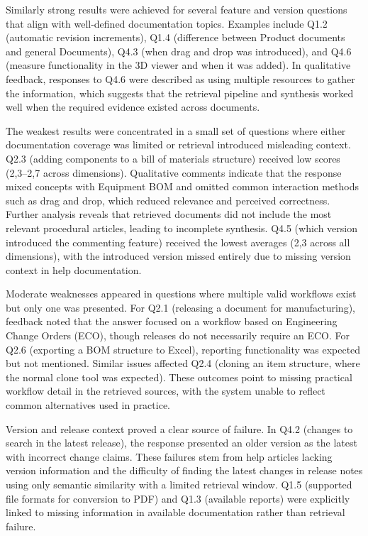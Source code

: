 Similarly strong results were achieved for several feature and version questions that align with well-defined documentation topics. Examples include Q1.2 (automatic revision increments), Q1.4 (difference between Product documents and general Documents), Q4.3 (when drag and drop was introduced), and Q4.6 (measure functionality in the 3D viewer and when it was added). In qualitative feedback, responses to Q4.6 were described as using multiple resources to gather the information, which suggests that the retrieval pipeline and synthesis worked well when the required evidence existed across documents.

The weakest results were concentrated in a small set of questions where either documentation coverage was limited or retrieval introduced misleading context. Q2.3 (adding components to a bill of materials structure) received low scores (2,3--2,7 across dimensions). Qualitative comments indicate that the response mixed concepts with Equipment BOM and omitted common interaction methods such as drag and drop, which reduced relevance and perceived correctness. Further analysis reveals that retrieved documents did not include the most relevant procedural articles, leading to incomplete synthesis. Q4.5 (which version introduced the commenting feature) received the lowest averages (2,3 across all dimensions), with the introduced version missed entirely due to missing version context in help documentation.

Moderate weaknesses appeared in questions where multiple valid workflows exist but only one was presented. For Q2.1 (releasing a document for manufacturing), feedback noted that the answer focused on a workflow based on Engineering Change Orders (ECO), though releases do not necessarily require an ECO. For Q2.6 (exporting a BOM structure to Excel), reporting functionality was expected but not mentioned. Similar issues affected Q2.4 (cloning an item structure, where the normal clone tool was expected). These outcomes point to missing practical workflow detail in the retrieved sources, with the system unable to reflect common alternatives used in practice.

Version and release context proved a clear source of failure. In Q4.2 (changes to search in the latest release), the response presented an older version as the latest with incorrect change claims. These failures stem from help articles lacking version information and the difficulty of finding the latest changes in release notes using only semantic similarity with a limited retrieval window. Q1.5 (supported file formats for conversion to PDF) and Q1.3 (available reports) were explicitly linked to missing information in available documentation rather than retrieval failure.

